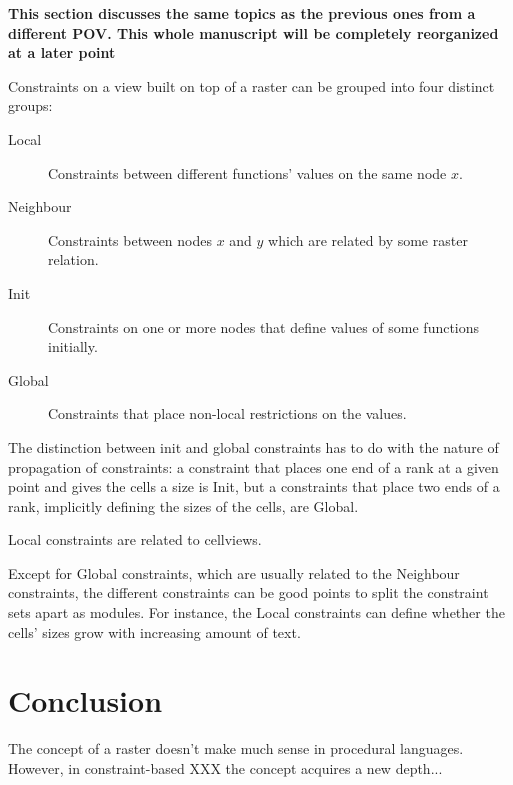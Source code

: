 \documentclass[a4paper]{article}
\begin{document}
{\bf This section discusses the same topics as the previous ones
from a different POV. This whole manuscript will be completely
reorganized at a later point}

Constraints on a view built on top of a raster can be 
grouped into four distinct groups:
\begin{description}
\item[Local]
	Constraints between different functions' values on the
		same node $x$.
\item[Neighbour]
	Constraints between nodes $x$ and $y$ which are
		related by some raster relation.
\item[Init]
	Constraints on one or more nodes that define values
		of some functions initially.
\item[Global]
	Constraints that place non-local restrictions on the values.
\end{description}

The distinction between init and global constraints
has to do with the nature of propagation of constraints:
a constraint that places one end of a rank at a given point
and gives the cells a size is Init, but a constraints
that place two ends of a rank, implicitly defining the sizes
of the cells, are Global.

Local constraints are related to cellviews.

Except for Global constraints, which are usually related to the
Neighbour constraints, the different constraints can be good points
to split the constraint sets apart as modules. For instance,
the Local constraints can define whether the cells' sizes grow
with increasing amount of text.




\section{Conclusion}

The concept of a raster doesn't make much sense in procedural languages.
However, in constraint-based XXX the concept acquires a new depth...







\end{document}
